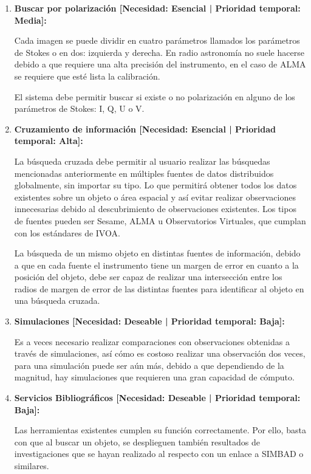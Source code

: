 \begin{enumerate}
	\item \textbf{Buscar por polarización [Necesidad: Esencial | Prioridad
temporal: Media]:}

Cada imagen se puede dividir en cuatro parámetros llamados los parámetros de
Stokes o en dos: izquierda y derecha. En radio astronomía no suele hacerse
debido a que requiere una alta precisión del instrumento, en el caso de ALMA se
requiere que esté lista la calibración.

El sistema debe permitir buscar si existe o no polarización en alguno de los
parámetros de Stokes: I, Q, U o V.

	\item \textbf{Cruzamiento de información [Necesidad: Esencial |
Prioridad temporal: Alta]:}

La búsqueda cruzada debe permitir al usuario realizar las búsquedas mencionadas
anteriormente en múltiples fuentes de datos distribuidos globalmente, sin
importar su tipo. Lo que permitirá obtener todos los datos existentes sobre un
objeto o área espacial y así evitar realizar observaciones innecesarias debido
al descubrimiento de observaciones existentes. Los tipos de fuentes pueden ser
Sesame, ALMA u Observatorios Virtuales, que cumplan con los estándares de IVOA.

La búsqueda de un mismo objeto en distintas fuentes de información, debido a
que en cada fuente el instrumento tiene un margen de error en cuanto a la
posición del objeto, debe ser capaz de realizar una intersección entre los
radios de margen de error de las distintas fuentes para identificar al objeto
en una búsqueda cruzada.

	\item \textbf{Simulaciones [Necesidad: Deseable | Prioridad temporal:
Baja]:}

Es a veces necesario realizar comparaciones con observaciones obtenidas a
través de simulaciones, así cómo es costoso  realizar una observación dos
veces, para una simulación puede ser aún más, debido a que dependiendo de la
magnitud, hay simulaciones que requieren una gran capacidad de cómputo.

	\item \textbf{Servicios Bibliográficos [Necesidad: Deseable | Prioridad
temporal: Baja]:}

Las herramientas existentes cumplen su función correctamente. Por ello, basta
con que al buscar un objeto, se desplieguen también resultados de
investigaciones que se hayan realizado al respecto con un enlace a SIMBAD o
similares.

\end{enumerate}
